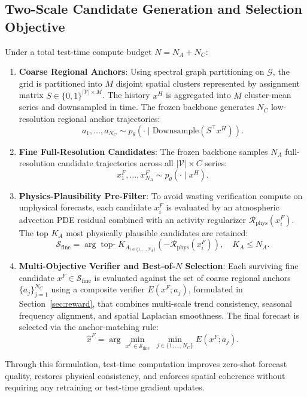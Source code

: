 \documentclass[preprint,12pt]{elsarticle}
\begin{document}
\subsection{Two-Scale Candidate Generation and Selection Objective}
Under a total test-time compute budget $N = N_A + N_C$:
\begin{enumerate}
    \item \textbf{Coarse Regional Anchors}: Using spectral graph partitioning on $\mathcal{G}$, the grid is partitioned into $M$ disjoint spatial clusters represented by assignment matrix $S \in \{0, 1\}^{|\mathcal{V}| \times M}$. The history $x^H$ is aggregated into $M$ cluster-mean series and downsampled in time. The frozen backbone generates $N_C$ low-resolution regional anchor trajectories:
    \begin{equation}
    a_1, \dots, a_{N_C} \sim p_\theta(\cdot \mid \text{Downsample}(S^\top x^H)).
    \label{eq:coarse_sampling}
    \end{equation}
    \item \textbf{Fine Full-Resolution Candidates}: The frozen backbone samples $N_A$ full-resolution candidate trajectories across all $|\mathcal{V}| \times C$ series:
    \begin{equation}
    x^F_1, \dots, x^F_{N_A} \sim p_\theta(\cdot \mid x^H).
    \label{eq:fine_sampling}
    \end{equation}
    \item \textbf{Physics-Plausibility Pre-Filter}: To avoid wasting verification compute on unphysical forecasts, each candidate $x^F_i$ is evaluated by an atmospheric advection PDE residual combined with an activity regularizer $\mathcal{R}_{\text{phys}}(x^F_i)$. The top $K_A$ most physically plausible candidates are retained:
    \begin{equation}
    \mathcal{S}_{\text{fine}} = \arg\operatorname{top-}K_A_{i \in \{1,\dots,N_A\}} \left( -\mathcal{R}_{\text{phys}}(x^F_i) \right), \quad K_A \le N_A.
    \label{eq:physics_filter}
    \end{equation}
    \item \textbf{Multi-Objective Verifier and Best-of-$N$ Selection}: Each surviving fine candidate $x^F \in \mathcal{S}_{\text{fine}}$ is evaluated against the set of coarse regional anchors $\{a_j\}_{j=1}^{N_C}$ using a composite verifier $E(x^F; a_j)$, formulated in Section~\ref{sec:reward}, that combines multi-scale trend consistency, seasonal frequency alignment, and spatial Laplacian smoothness. The final forecast is selected via the anchor-matching rule:
    \begin{equation}
    \hat{x}^F = \arg\min_{x^F \in \mathcal{S}_{\text{fine}}} \; \min_{j \in \{1,\dots,N_C\}} E(x^F; a_j).
    \label{eq:selection}
    \end{equation}
\end{enumerate}
Through this formulation, test-time computation improves zero-shot forecast quality, restores physical consistency, and enforces spatial coherence without requiring any retraining or test-time gradient updates.
\end{document}

